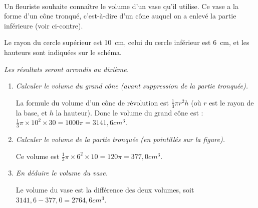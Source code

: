 \documentclass[12pt]{article}
\begin{document}
\begin{exercice}~
  \begin{multicols}{2}
    \begin{em}
      Un fleuriste souhaite connaître le volume d'un vase qu'il utilise. Ce vase a la forme d'un cône tronqué, c'est-à-dire d'un cône auquel on a enlevé la partie inférieure (voir ci-contre).

      Le rayon du cercle supérieur est 10~cm, celui du cercle inférieur est 6~cm, et les hauteurs sont indiquées sur le schéma.
    \end{em}

    \columnbreak

    \begin{center}
    \end{center}
  \end{multicols}

  \emph{Les résultats seront arrondis au dixième.}

  \begin{enumerate}[(1)]
    \item \emph{Calculer le volume du grand cône (avant suppression de la partie tronquée).}
      
      La formule du volume d'un cône de révolution est $\frac{1}{3}\pi r^2h$ (où $r$ est le rayon de la base, et $h$ la hauteur). Donc le volume du grand cône est : $\frac{1}{3}\pi\times10^2\times30=1000\pi=3141,6cm^3$.
    \item \emph{Calculer le volume de la partie tronquée (en pointillés sur la figure).}
      
      Ce volume est $\frac{1}{3}\pi\times6^2\times10=120\pi=377,0cm^3$.
    \item \emph{En déduire le volume du vase.}
      
      Le volume du vase est la différence des deux volumes, soit $3141,6-377,0=2764,6cm^3$.
  \end{enumerate}

\end{exercice}
\end{document}
